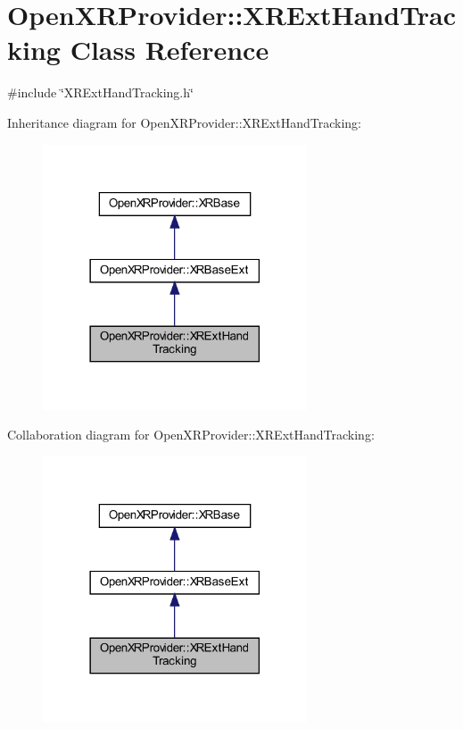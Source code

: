 \hypertarget{class_open_x_r_provider_1_1_x_r_ext_hand_tracking}{}\section{Open\+X\+R\+Provider\+::X\+R\+Ext\+Hand\+Tracking Class Reference}
\label{class_open_x_r_provider_1_1_x_r_ext_hand_tracking}


{\ttfamily \#include \char`\"{}X\+R\+Ext\+Hand\+Tracking.\+h\char`\"{}}



Inheritance diagram for Open\+X\+R\+Provider\+::X\+R\+Ext\+Hand\+Tracking\+:\nopagebreak
\begin{figure}[H]
\begin{center}
\leavevmode
\includegraphics[width=222pt]{class_open_x_r_provider_1_1_x_r_ext_hand_tracking__inherit__graph}
\end{center}
\end{figure}


Collaboration diagram for Open\+X\+R\+Provider\+::X\+R\+Ext\+Hand\+Tracking\+:\nopagebreak
\begin{figure}[H]
\begin{center}
\leavevmode
\includegraphics[width=222pt]{class_open_x_r_provider_1_1_x_r_ext_hand_tracking__coll__graph}
\end{center}
\end{figure}
